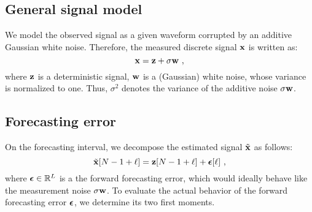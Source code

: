 \subsection{General signal model}
We model the observed signal as a given waveform corrupted by an additive Gaussian white noise. Therefore, the measured discrete signal ${\mathbf x}$ is written as:
\[ 
{\mathbf x} = {\mathbf z} + \sigma{\mathbf w}\ ,
\]
where ${\mathbf z}$ is a deterministic signal, ${\mathbf w}$ is a (Gaussian) white noise, whose variance is normalized to one. Thus, $\sigma^2$ denotes the variance of the additive noise $\sigma{\mathbf w}$.

\subsection{Forecasting error}
On the forecasting interval, we decompose the estimated signal $\tilde{{\mathbf x}}$ as follows:
\[
\tilde {{\mathbf x}}[N-1+\ell] = {\mathbf z}[N-1+\ell] + \boldsymbol{\epsilon}[\ell]\ ,
\]
where $\boldsymbol{\epsilon}\in{\mathbb R}^L$ is a the forward forecasting error, which would ideally behave like the measurement noise $\sigma{\mathbf w}$.  To evaluate the actual behavior of the forward forecasting error $\boldsymbol{\epsilon}$, we determine its two first moments.

